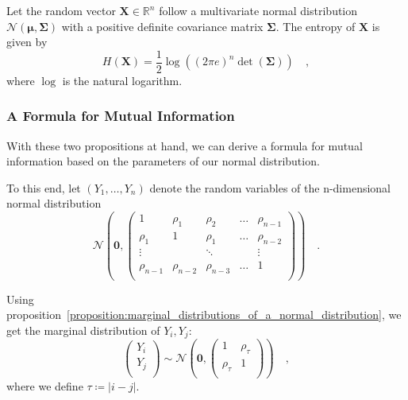 \documentclass[../../main.tex]{subfiles}
\begin{document}
\begin{proposition}
    \label{proposition:entropy_of_multivariate_normal}
    Let the random vector $\bm{X} \in \mathbb{R}^n$ follow a multivariate normal distribution $\mathcal{N}(\bm{\mu}, \bm{\Sigma})$ with a positive definite covariance matrix $\bm{\Sigma}$. The entropy of $\bm{X}$ is given by
    \[
        H(\bm{X}) = \frac{1}{2} \log\left( (2\pi e)^n \det(\bm{\Sigma}) \right) \quad,
    \]
    where $\log$ is the natural logarithm.
\end{proposition}

\subsubsection{A Formula for Mutual Information}
With these two propositions at hand, we can derive a formula for mutual information based on the parameters of our normal distribution.

To this end, let $(Y_1, \dots, Y_n)$ denote the random variables of the n-dimensional normal distribution
\[
    \mathcal{N}\left(\bm{0}, \begin{pmatrix*}
        1& \rho_1& \rho_2& \dots & \rho_{n-1} \\
        \rho_1& 1& \rho_1& \dots & \rho_{n-2} \\
        \vdots &  & \ddots & & \vdots \\
        \rho_{n-1} & \rho_{n-2} & \rho_{n-3} & \dots & 1 \\
    \end{pmatrix*}\right) \quad .
\]

Using proposition~\ref{proposition:marginal_distributions_of_a_normal_distribution}, we get the marginal distribution of $Y_i, Y_j$:
\[
    \begin{pmatrix*}
        Y_i \\
        Y_j \\
    \end{pmatrix*}
    \sim \mathcal{N}\left(\bm{0}, \begin{pmatrix*}
        1 & \rho_\tau \\
        \rho_\tau & 1 \\
    \end{pmatrix*}\right)
    \quad ,
\]
where we define $\tau \coloneqq |i - j|$.
\end{document}
